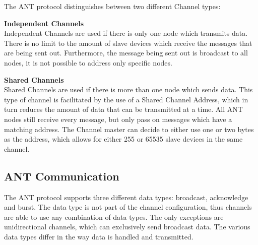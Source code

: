 The ANT protocol distinguishes between two different Channel types:
\begin{description}
	\item{\textbf{Independent Channels}} \hfill \\ Independent Channels are used if there is only one node which transmits data. There is no limit to the amount of slave devices which receive the messages that are being sent out. Furthermore, the message being sent out is broadcast to all nodes, it is not possible to address only specific nodes.
	\item{\textbf{Shared Channels}} \hfill \\ Shared Channels are used if there is more than one node which sends data. This type of channel is facilitated by the use of a Shared Channel Address, which in turn reduces the amount of data that can be transmitted at a time. All ANT nodes still receive every message, but only pass on messages which have a matching address. The Channel master can decide to either use one or two bytes as the address, which allows for either 255 or 65535 slave devices in the same channel. 
\end{description}

\subsection{ANT Communication}

The ANT protocol supports three different data types: broadcast, acknowledge and burst. The data type is not part of the channel configuration, thus channels are able to use any combination of data types. The only exceptions are unidirectional channels, which can exclusively send broadcast data. The various data types differ in the way data is handled and transmitted.

